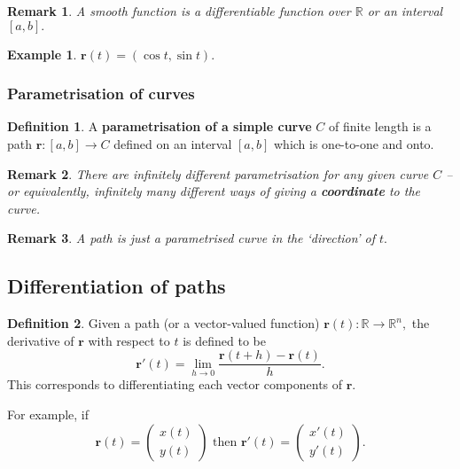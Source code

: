 \documentclass[12pt, a4paper]{article}
\newcommand{\bb}[1]{\mathbb{#1}}
\newcommand{\f}[2]{\frac{#1}{#2}}
\newtheorem*{remark}{Remark}
\theoremstyle{definition}
\newtheorem{definition}{Definition}[section]
\newtheorem*{example}{Example}
\theoremstyle{plain}
\begin{document}
\begin{remark}
A smooth function is a differentiable function over $\bb{R}$ or an interval $[a,b].$
\end{remark}

\begin{example}
$\mathbf{r}(t)=(\cos t, \sin t).$
\end{example}

\subsubsection{Parametrisation of curves}

\begin{definition}
A \textbf{parametrisation of a simple curve} $C$ of finite length is a path $\mathbf{r} : [a,b] \to C$ defined on an interval $[a,b]$ which is one-to-one and onto. 
\end{definition}

\begin{remark}
There are infinitely different parametrisation for any given curve $C$ -- or equivalently, infinitely many different ways of giving a \textbf{coordinate} to the curve.
\end{remark}

\begin{remark}
A path is just a parametrised curve in the `direction' of $t.$
\end{remark}

\subsection{Differentiation of paths}

\begin{definition}
Given a path (or a vector-valued function) $\mathbf{r}(t): \bb{R} \to \bb{R}^n,$ the derivative of $\mathbf{r}$ with respect to $t$ is defined to be $$\mathbf{r}'(t)=\lim_{h \to 0}\f{\mathbf{r}(t+h)-\mathbf{r}(t)}{h}.$$ This corresponds to differentiating each vector components of $\mathbf{r}.$
\end{definition} 

For example, if $$\mathbf{r}(t) = \begin{pmatrix} x(t) \\ y(t) \end{pmatrix} \text{ then } \mathbf{r}'(t) = \begin{pmatrix} x'(t) \\ y'(t) \end{pmatrix}.$$
\end{document}
